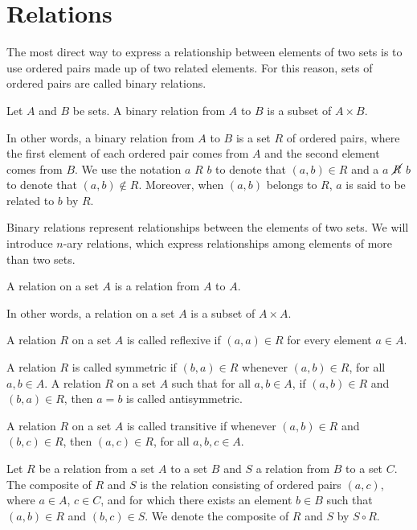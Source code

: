 \documentclass[../discrete.tex]{subfiles}
\begin{document}
\chapter{Relations}
The most direct way to express a relationship between elements of two sets is to use ordered 
pairs made up of two related elements. For this reason, sets of ordered pairs are called binary relations.

\begin{definition}
    Let $A$ and $B$ be sets. A binary relation from $A$ to $B$ is a subset of $A\times B$.
\end{definition}

In other words, a binary relation from $A$ to $B$ is a set $R$ of ordered pairs, where the first element 
of each ordered pair comes from $A$ and the second element comes from $B$. We use the notation $a$ $R$ $b$ to denote that 
$(a,b)\in R$ and a $a$ $\cancel{R}$ $b$ to denote that $(a,b)\not\in R$. Moreover, when $(a,b)$ belongs to $R$, $a$ is said to be related to $b$ by $R$.

Binary relations represent relationships between the elements of two sets. We will introduce $n$-ary relations,
which express relationships among elements of more than two sets. 

\begin{definition}
    A relation on a set $A$ is a relation from $A$ to $A$.
\end{definition}

In other words, a relation on a set $A$ is a subset of $A\times A$.

\begin{definition}
    A relation $R$ on a set $A$ is called reflexive if $(a,a)\in R$ for every element $a\in A$.
\end{definition}

\begin{definition}
    A relation $R$ is called symmetric if $(b,a)\in R$ whenever $(a,b)\in R$, for all $a,b\in A$. A relation $R$ on a set $A$ such that for all 
    $a,b\in A$, if $(a,b)\in R$ and $(b,a)\in R$, then $a=b$ is called antisymmetric.
\end{definition}

\begin{definition}
    A relation $R$ on a set $A$ is called transitive if whenever $(a,b)\in R$ and $(b,c)\in R$, then $(a,c)\in R$, for all $a,b,c\in A$.
\end{definition}

\begin{definition}
    Let $R$ be a relation from a set $A$ to a set $B$ and $S$ a relation from $B$ to a set $C$. The composite of $R$ and $S$ is the relation 
    consisting of ordered pairs $(a,c)$, where $a\in A$, $c\in C$, and for which there exists an element $b\in B$ such that 
    $(a,b)\in R$ and $(b,c)\in S$. We denote the composite of $R$ and $S$ by $S\circ R$.
\end{definition}
\end{document}
